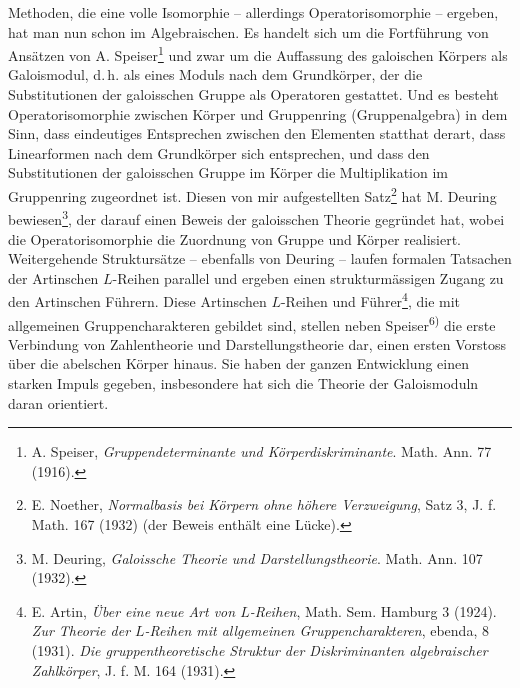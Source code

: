 Methoden, die eine volle Isomorphie -- allerdings Operatorisomorphie -- ergeben, hat man nun schon im Algebraischen. Es handelt sich um die Fortführung von Ansätzen von A. Speiser\footnote{A. Speiser, \emph{Gruppendeterminante und Körperdiskriminante}. Math. Ann. 77 (1916).} und zwar um die Auffassung des galoischen Körpers als \glqq{}Galoismodul\grqq{}, d.\,h. als eines Moduls nach dem Grundkörper, der die Substitutionen der galoisschen Gruppe als Operatoren gestattet. Und es besteht Operatorisomorphie zwischen Körper und Gruppenring (Gruppenalgebra) in dem Sinn, dass eindeutiges Entsprechen zwischen den Elementen statthat derart, dass Linearformen nach dem Grundkörper sich entsprechen, und dass den Substitutionen der galoisschen Gruppe im Körper die Multiplikation im Gruppenring zugeordnet ist. Diesen von mir aufgestellten Satz\footnote{E. Noether, \emph{Normalbasis bei Körpern ohne höhere Verzweigung}, Satz 3, J. f. Math. 167 (1932) (der Beweis enthält eine Lücke).} hat M. Deuring bewiesen\footnote{M. Deuring, \emph{Galoissche Theorie und Darstellungstheorie}. Math. Ann. 107 (1932).}, der darauf einen Beweis der galoisschen Theorie gegründet hat, wobei die Operatorisomorphie die Zuordnung von Gruppe und Körper realisiert. Weitergehende Struktursätze -- ebenfalls von Deuring -- laufen formalen Tatsachen der Artinschen \(L\)-Reihen parallel und ergeben einen strukturmässigen Zugang zu den Artinschen Führern. Diese Artinschen \(L\)-Reihen und Führer\footnote{E. Artin, \emph{Über eine neue Art von \(L\)-Reihen}, Math. Sem. Hamburg 3 (1924). \emph{Zur Theorie der \(L\)-Reihen mit allgemeinen Gruppencharakteren}, ebenda, 8 (1931). \emph{Die gruppentheoretische Struktur der Diskriminanten algebraischer Zahlkörper}, J. f. M. 164 (1931).}, die mit allgemeinen Gruppencharakteren gebildet sind, stellen neben Speiser\textsuperscript{6)} die erste Verbindung von Zahlentheorie und Darstellungstheorie dar, einen ersten Vorstoss über die abelschen Körper hinaus. Sie haben der ganzen Entwicklung einen starken Impuls gegeben, insbesondere hat sich die Theorie der Galoismoduln daran orientiert.

